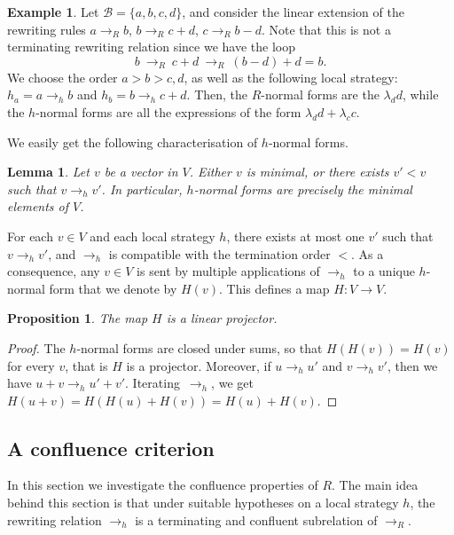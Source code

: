 \documentclass[10pt]{easychair}
\newtheorem{lemma}[theorem]{Lemma}
\newtheorem{proposition}[theorem]{Proposition}
\theoremstyle{definition}
\newtheorem{example}[theorem]{Example}
\newcommand\secDeuxDeux{A confluence criterion}
\newcommand\basis{\mathscr{B}}
\newcommand\rewR{\to_R}
\newcommand\rewh{\to_h}
\begin{document}
\begin{example}\label{ex:h_norma_form}
  Let $\basis=\{a,b,c,d\}$, and consider the linear extension of the
  rewriting rules $a\rewR b$, $b\rewR c+d$, $c\rewR b-d$. Note that this
  is not a terminating rewriting relation since we have the loop
  \[b\ \rewR\ c+d\ \rewR\ (b-d)+d=b.\]
  We choose the order $a>b>c,d$, as well as the following local strategy:
  $h_a=a\rewh b$ and $h_b=b\rewh c+d$. Then, the $R$-normal forms are the
  $\lambda_dd$, while the $h$-normal forms are all the expressions of the
  form $\lambda_dd+\lambda_cc$.
\end{example}

We easily get the following characterisation of $h$-normal forms.

\begin{lemma}\label{lem:h_normal_forms}
  Let $v$ be a vector in $V$. Either $v$ is minimal, or there exists
  $v'<v$ such that $v\rewh v'$. In particular, $h$-normal forms are
  precisely the minimal elements of $V$.
\end{lemma}
\medskip

For each $v\in V$ and each local strategy $h$, there exists at most one
$v'$ such that $v \rewh v'$, and $\rewh$ is compatible with the
termination order $<$. As a consequence, any $v\in V$ is sent by multiple
applications of $\rewh$ to a unique $h$-normal form that we denote by
$H(v)$. This defines a map $H :V\to V$.  

\begin{proposition}\label{prop:linearity_of_H}
  The map $H$ is a linear projector.
\end{proposition}

\begin{proof}
  The $h$-normal forms are closed under sums, so that $H(H(v))=H(v)$ for
  every $v$, that is $H$ is a projector. Moreover, if $u\rewh u'$ and
  $v\rewh v'$, then we have $u+v\rewh u'+v'$. Iterating~$\rewh$, we get
  $H(u+v)=H(H(u)+H(v))=H(u)+H(v)$. 
\end{proof}

\subsection{\secDeuxDeux}\label{sec:deuxDeux}

In this section we investigate the confluence properties of $R$. The main
idea behind this section is that under suitable hypotheses on a local
strategy $h$, the rewriting relation $\rewh$ is a terminating and
confluent subrelation of $\rewR$.
\medskip
\end{document}

